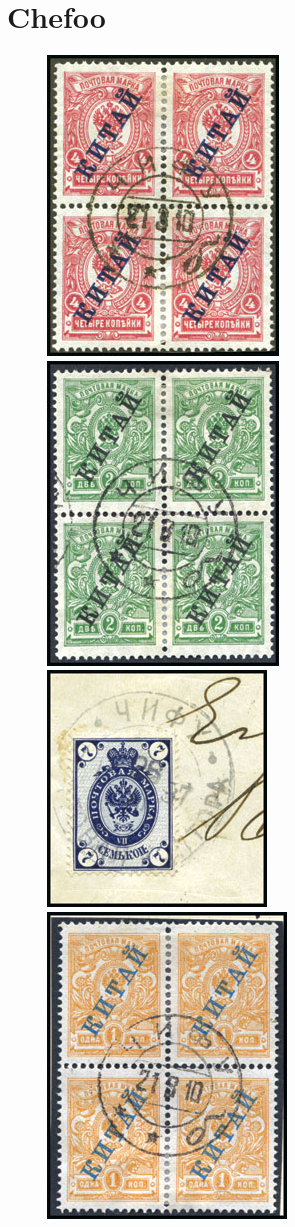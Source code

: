 \chapter{Chefoo}

\begin{figure}[htbp]
\centering
\includegraphics[width=.40\textwidth]{../russian-post-offices-in-china/10093.jpg}
\includegraphics[width=.40\textwidth]{../russian-post-offices-in-china/10093-1.jpg}
\includegraphics[width=.40\textwidth]{../russian-post-offices-in-china/10093-2.jpg}
\includegraphics[width=.40\textwidth]{../russian-post-offices-in-china/10093-3.jpg}

\end{figure}
